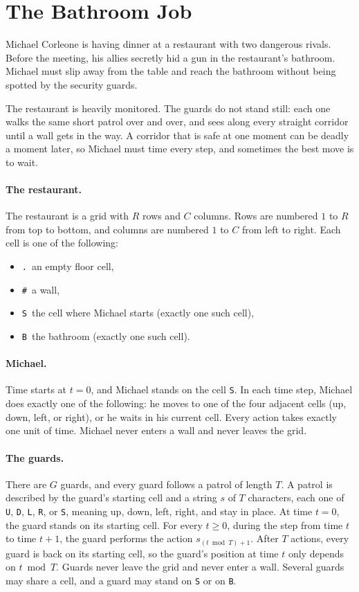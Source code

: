 \documentclass[11pt]{article}
\newcommand{\problemname}[1]{\section*{#1}}
\begin{document}
\problemname{The Bathroom Job}

Michael Corleone is having dinner at a restaurant with two dangerous rivals.
Before the meeting, his allies secretly hid a gun in the restaurant's bathroom.
Michael must slip away from the table and reach the bathroom without being spotted by the security guards.

The restaurant is heavily monitored.
The guards do not stand still: each one walks the same short patrol over and over, and sees along every straight corridor until a wall gets in the way.
A corridor that is safe at one moment can be deadly a moment later, so Michael must time every step, and sometimes the best move is to wait.

\paragraph{The restaurant.}
The restaurant is a grid with $R$ rows and $C$ columns.
Rows are numbered $1$ to $R$ from top to bottom, and columns are numbered $1$ to $C$ from left to right.
Each cell is one of the following:
\begin{itemize}
    \item \texttt{.}\ an empty floor cell,
    \item \texttt{\#}\ a wall,
    \item \texttt{S}\ the cell where Michael starts (exactly one such cell),
    \item \texttt{B}\ the bathroom (exactly one such cell).
\end{itemize}

\paragraph{Michael.}
Time starts at $t = 0$, and Michael stands on the cell \texttt{S}.
In each time step, Michael does exactly one of the following: he moves to one of the four adjacent cells (up, down, left, or right), or he waits in his current cell.
Every action takes exactly one unit of time.
Michael never enters a wall and never leaves the grid.

\paragraph{The guards.}
There are $G$ guards, and every guard follows a patrol of length $T$.
A patrol is described by the guard's starting cell and a string $s$ of $T$ characters, each one of \texttt{U}, \texttt{D}, \texttt{L}, \texttt{R}, or \texttt{S}, meaning up, down, left, right, and stay in place.
At time $t = 0$, the guard stands on its starting cell.
For every $t \ge 0$, during the step from time $t$ to time $t+1$, the guard performs the action $s_{(t \bmod T) + 1}$.
After $T$ actions, every guard is back on its starting cell, so the guard's position at time $t$ only depends on $t \bmod T$.
Guards never leave the grid and never enter a wall.
Several guards may share a cell, and a guard may stand on \texttt{S} or on \texttt{B}.
\end{document}
